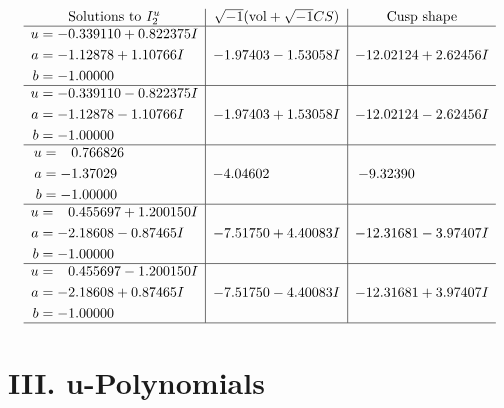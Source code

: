 \documentclass[1p]{elsarticle_modified}
\theoremstyle{definition}
\newcommand{\I}{\sqrt{-1}}
\begin{document}
$$\begin{array}{c|c|c}  
\text{Solutions to }I^u_{2}& \I (\text{vol} + \sqrt{-1}CS) & \text{Cusp shape}\\
 \hline 
\begin{aligned}
u &= -0.339110 + 0.822375 I \\
a &= -1.12878 + 1.10766 I \\
b &= -1.00000\phantom{ +0.000000I}\end{aligned}
 & -1.97403 - 1.53058 I & -12.02124 + 2.62456 I \\ \hline\begin{aligned}
u &= -0.339110 - 0.822375 I \\
a &= -1.12878 - 1.10766 I \\
b &= -1.00000\phantom{ +0.000000I}\end{aligned}
 & -1.97403 + 1.53058 I & -12.02124 - 2.62456 I \\ \hline\begin{aligned}
u &= \phantom{-}0.766826\phantom{ +0.000000I} \\
a &= -1.37029\phantom{ +0.000000I} \\
b &= -1.00000\phantom{ +0.000000I}\end{aligned}
 & -4.04602\phantom{ +0.000000I} & -9.32390\phantom{ +0.000000I} \\ \hline\begin{aligned}
u &= \phantom{-}0.455697 + 1.200150 I \\
a &= -2.18608 - 0.87465 I \\
b &= -1.00000\phantom{ +0.000000I}\end{aligned}
 & -7.51750 + 4.40083 I & -12.31681 - 3.97407 I \\ \hline\begin{aligned}
u &= \phantom{-}0.455697 - 1.200150 I \\
a &= -2.18608 + 0.87465 I \\
b &= -1.00000\phantom{ +0.000000I}\end{aligned}
 & -7.51750 - 4.40083 I & -12.31681 + 3.97407 I\\
 \hline 
 \end{array}$$\newpage
\newpage\renewcommand{\arraystretch}{1}
\centering \section*{ III. u-Polynomials}
\end{document}
